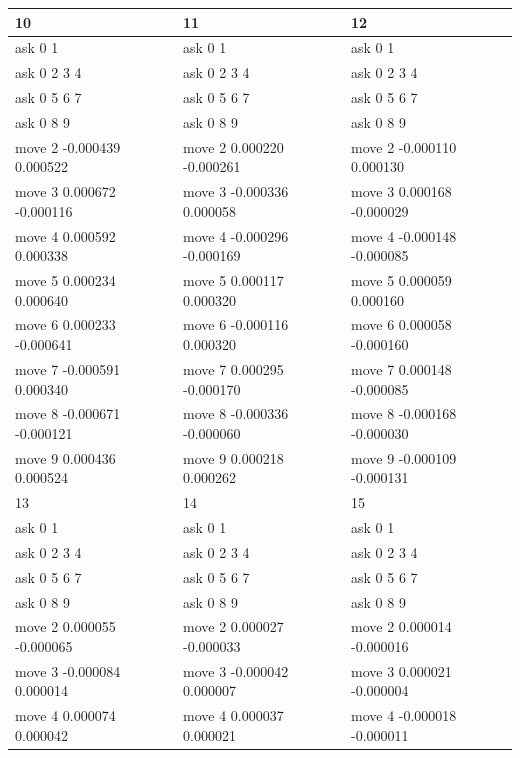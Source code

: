 \documentclass{ctexart}
\begin{document}
\begin{flushleft}
\begin{table}[H]
\begin{tabular}{|l|l|l|}
    \end{tabular}
  \end{table}
  \begin{table}[H]
    \centering
    \begin{tabular}{|l|l|l|}
    \hline
      10 & 11 & 12 \\ \hline
      ask 0 1 & ask 0 1 & ask 0 1 \\ \hline
      ask 0 2 3 4 & ask 0 2 3 4 & ask 0 2 3 4 \\ \hline
      ask 0 5 6 7 & ask 0 5 6 7 & ask 0 5 6 7 \\ \hline
      ask 0 8 9 & ask 0 8 9 & ask 0 8 9 \\ \hline
      move 2 -0.000439 0.000522 & move 2 0.000220 -0.000261 & move 2 -0.000110 0.000130 \\ \hline
      move 3 0.000672 -0.000116 & move 3 -0.000336 0.000058 & move 3 0.000168 -0.000029 \\ \hline
      move 4 0.000592 0.000338 & move 4 -0.000296 -0.000169 & move 4 -0.000148 -0.000085 \\ \hline
      move 5 0.000234 0.000640 & move 5 0.000117 0.000320 & move 5 0.000059 0.000160 \\ \hline
      move 6 0.000233 -0.000641 & move 6 -0.000116 0.000320 & move 6 0.000058 -0.000160 \\ \hline
      move 7 -0.000591 0.000340 & move 7 0.000295 -0.000170 & move 7 0.000148 -0.000085 \\ \hline
      move 8 -0.000671 -0.000121 & move 8 -0.000336 -0.000060 & move 8 -0.000168 -0.000030 \\ \hline
      move 9 0.000436 0.000524 & move 9 0.000218 0.000262 & move 9 -0.000109 -0.000131 \\ \hline
      13 & 14 & 15 \\ \hline
      ask 0 1 & ask 0 1 & ask 0 1 \\ \hline
      ask 0 2 3 4 & ask 0 2 3 4 & ask 0 2 3 4 \\ \hline
      ask 0 5 6 7 & ask 0 5 6 7 & ask 0 5 6 7 \\ \hline
      ask 0 8 9 & ask 0 8 9 & ask 0 8 9 \\ \hline
      move 2 0.000055 -0.000065 & move 2 0.000027 -0.000033 & move 2 0.000014 -0.000016 \\ \hline
      move 3 -0.000084 0.000014 & move 3 -0.000042 0.000007 & move 3 0.000021 -0.000004 \\ \hline
      move 4 0.000074 0.000042 & move 4 0.000037 0.000021 & move 4 -0.000018 -0.000011 \\ \hline

\end{tabular}
\end{table}
\end{flushleft}
\end{document}
